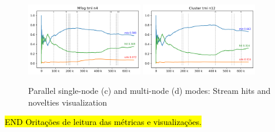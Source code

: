 \documentclass[conference]{IEEEtran}
\begin{document}
\begin{figure}[tb]
  \centerline{
    \includegraphics[width=0.45\textwidth]{../experiments/rpi/almoco/tmi-n4.log.png}
    \includegraphics[width=0.45\textwidth]{../experiments/rpi/almoco/big-cluster.log.png}
    }
  \caption{Parallel single-node (c) and multi-node (d) modes: Stream hits and novelties visualization}
  \label{fig:java-serial}
\end{figure}


\hl{END Oritações de leitura das métricas e visualizações.}
\end{document}
